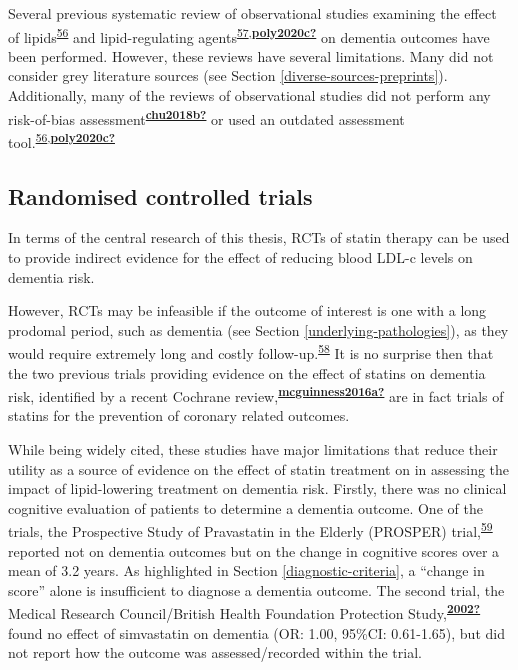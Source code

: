 \documentclass[a4paper, twoside]{templates/ociamthesis}
\begin{document}
Several previous systematic review of observational studies examining the effect of lipids\textsuperscript{\protect\hyperlink{ref-anstey2015}{56}} and lipid-regulating agents\textsuperscript{\protect\hyperlink{ref-chu2018}{57},\protect\hyperlink{ref-poly2020c}{\textbf{poly2020c?}}} on dementia outcomes have been performed. However, these reviews have several limitations. Many did not consider grey literature sources (see Section \ref{diverse-sources-preprints}). Additionally, many of the reviews of observational studies did not perform any risk-of-bias assessment\textsuperscript{\protect\hyperlink{ref-chu2018b}{\textbf{chu2018b?}}} or used an outdated assessment tool.\textsuperscript{\protect\hyperlink{ref-anstey2015}{56},\protect\hyperlink{ref-poly2020c}{\textbf{poly2020c?}}}

\hypertarget{randomised-controlled-trials}{%
\subsection{Randomised controlled trials}\label{randomised-controlled-trials}}

In terms of the central research of this thesis, RCTs of statin therapy can be used to provide indirect evidence for the effect of reducing blood LDL-c levels on dementia risk.

However, RCTs may be infeasible if the outcome of interest is one with a long prodomal period, such as dementia (see Section \ref{underlying-pathologies}), as they would require extremely long and costly follow-up.\textsuperscript{\protect\hyperlink{ref-ritchie2015}{58}} It is no surprise then that the two previous trials providing evidence on the effect of statins on dementia risk, identified by a recent Cochrane review,\textsuperscript{\protect\hyperlink{ref-mcguinness2016a}{\textbf{mcguinness2016a?}}} are in fact trials of statins for the prevention of coronary related outcomes.

While being widely cited, these studies have major limitations that reduce their utility as a source of evidence on the effect of statin treatment on in assessing the impact of lipid-lowering treatment on dementia risk. Firstly, there was no clinical cognitive evaluation of patients to determine a dementia outcome. One of the trials, the Prospective Study of Pravastatin in the Elderly (PROSPER) trial,\textsuperscript{\protect\hyperlink{ref-trompet2010}{59}} reported not on dementia outcomes but on the change in cognitive scores over a mean of 3.2 years. As highlighted in Section \ref{diagnostic-criteria}, a ``change in score'' alone is insufficient to diagnose a dementia outcome. The second trial, the Medical Research Council/British Health Foundation Protection Study,\textsuperscript{\protect\hyperlink{ref-2002}{\textbf{2002?}}} found no effect of simvastatin on dementia (OR: 1.00, 95\%CI: 0.61-1.65), but did not report how the outcome was assessed/recorded within the trial.
\end{document}
